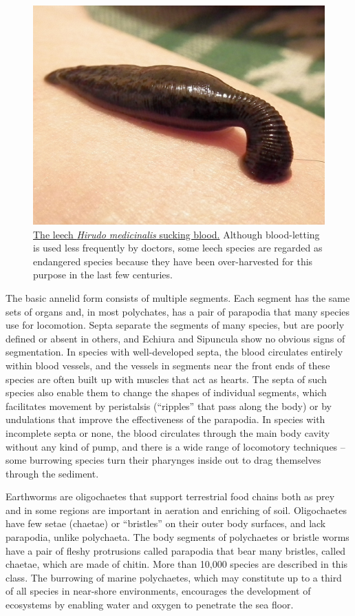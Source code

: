 \begin{figure}

{\centering \includegraphics[width=0.7\linewidth]{./figures/animals/Sucking_leech} 

}

\caption{\href{https://commons.wikimedia.org/wiki/File:Sucking_leech.jpg}{The leech \emph{Hirudo medicinalis} sucking blood.} Although blood-letting is used less frequently by doctors, some leech species are regarded as endangered species because they have been over-harvested for this purpose in the last few centuries.}\label{fig:leech}
\end{figure}

The basic annelid form consists of multiple segments. Each segment has the same sets of organs and, in most polychates, has a pair of parapodia that many species use for locomotion. Septa separate the segments of many species, but are poorly defined or absent in others, and Echiura and Sipuncula show no obvious signs of segmentation. In species with well-developed septa, the blood circulates entirely within blood vessels, and the vessels in segments near the front ends of these species are often built up with muscles that act as hearts. The septa of such species also enable them to change the shapes of individual segments, which facilitates movement by peristalsis (``ripples'' that pass along the body) or by undulations that improve the effectiveness of the parapodia. In species with incomplete septa or none, the blood circulates through the main body cavity without any kind of pump, and there is a wide range of locomotory techniques -- some burrowing species turn their pharynges inside out to drag themselves through the sediment.

Earthworms are oligochaetes that support terrestrial food chains both as prey and in some regions are important in aeration and enriching of soil. Oligochaetes have few setae (chaetae) or ``bristles'' on their outer body surfaces, and lack parapodia, unlike polychaeta. The body segments of polychaetes or bristle worms have a pair of fleshy protrusions called parapodia that bear many bristles, called chaetae, which are made of chitin. More than 10,000 species are described in this class. The burrowing of marine polychaetes, which may constitute up to a third of all species in near-shore environments, encourages the development of ecosystems by enabling water and oxygen to penetrate the sea floor.



